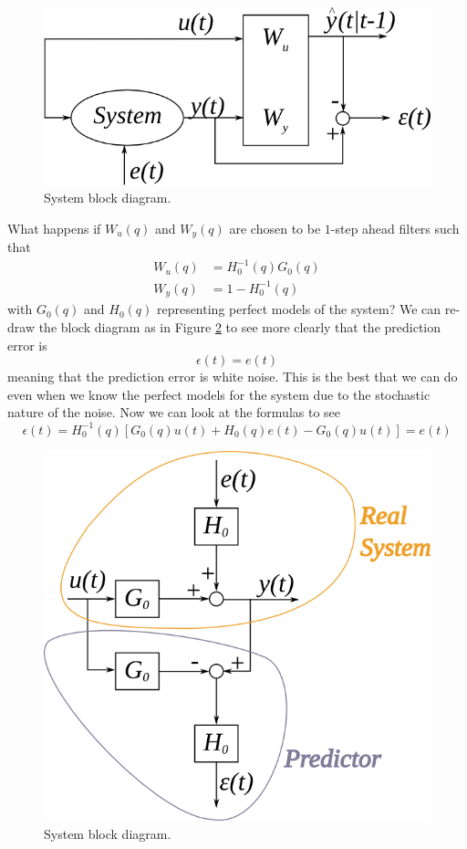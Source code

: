 \begin{figure}[ht!]
	\centering
	\includegraphics[width=.6\textwidth]{images/12block1}
	\caption{System block diagram.}
	\label{fig:12block1}
\end{figure}

What happens if $W_u(q)$ and $W_y(q)$ are chosen to be $1$-step ahead filters such that
\begin{align*}
W_u(q) &= H_0^{-1}(q)G_0(q) \\
W_y(q) &= 1-H_0^{-1}(q)
\end{align*}
with $G_0(q)$ and $H_0(q)$ representing perfect models of the system? We can re-draw the block diagram as in Figure \ref{fig:12block2} to see more clearly that the prediction error is
$$\epsilon(t)=e(t)$$
meaning that the prediction error is white noise. This is the best that we can do even when we know the perfect models for the system due to the stochastic nature of the noise. Now we can look at the formulas to see
$$\epsilon(t) = H_0^{-1}(q)[G_0(q)u(t) + H_0(q)e(t) - G_0(q)u(t)] = e(t)$$

\begin{figure}[ht!]
	\centering
	\includegraphics[width=.6\textwidth]{images/12block2}
	\caption{System block diagram.}
	\label{fig:12block2}
\end{figure}

